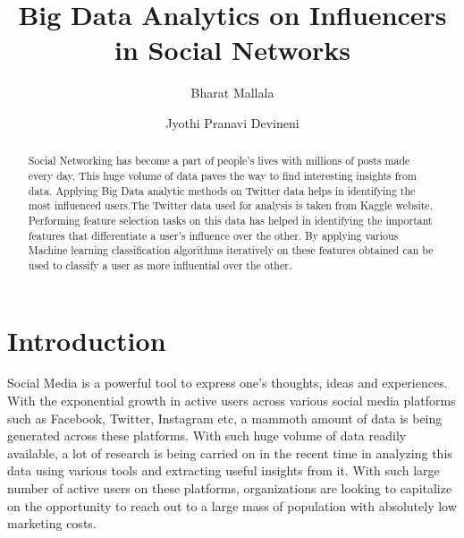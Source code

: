 \documentclass[sigconf]{acmart}
\begin{document}
\title{Big Data Analytics on Influencers in Social Networks}



\author{Bharat Mallala}

\author{Jyothi Pranavi Devineni}




\begin{abstract}
Social Networking has become a part of people's lives with millions
of posts made every day. This huge volume of data paves the way to find interesting insights from data. Applying Big Data analytic methods on Twitter data helps in identifying the most influenced users.The Twitter data used for analysis is taken from Kaggle website. Performing feature selection tasks on this data has helped in identifying the important features that differentiate a user's influence over the other. By applying various Machine learning classification algorithms iteratively on these features obtained can be used to classify a user as more influential over the other. 

\end{abstract}

\maketitle
\section{Introduction}
Social Media is a powerful tool to express one's thoughts, ideas and experiences. With the exponential growth in active users across various social media platforms such as Facebook, Twitter, Instagram etc, a mammoth amount of data is being generated across these platforms. With such huge volume of data readily available, a lot of research is being carried on in the recent time in analyzing this data using various tools and extracting useful insights from it. With such large number of active users on these platforms, organizations are looking to capitalize on the opportunity to reach out to a large mass of population with absolutely low marketing costs.
\end{document}
